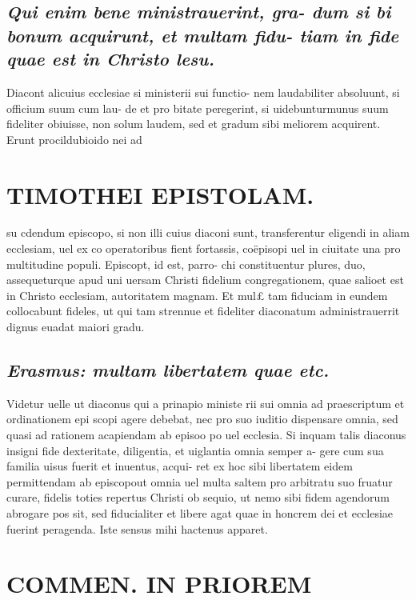 \documentclass{article}
\begin{document}
\begin{pages}
\subsection*{\textit{Qui enim bene ministrauerint, gra- dum si bi bonum acquirunt, et multam fidu- tiam in fide quae est in Christo lesu. }}\pstart Diacont alicuius ecclesiae si ministerii sui functio- nem laudabiliter absoluunt, si officium suum cum lau- de et pro bitate peregerint, si uidebunturmunus suum fideliter obiuisse, non solum laudem, sed et gradum sibi meliorem acquirent. Erunt procildubioido nei ad  \pend
\section*{TIMOTHEI EPISTOLAM. }
\marginpar{[ p.87 ]}\pstart su cdendum episcopo, si non illi cuius diaconi sunt, transferentur eligendi in aliam ecclesiam, uel ex co operatoribus fient fortassis, coëpisopi uel in ciuitate una pro multitudine populi. Episcopt, id est, parro- chi constituentur plures, duo, assequeturque apud uni uersam Christi fidelium congregationem, quae salioet est in Christo ecclesiam, autoritatem magnam. Et mul£ tam fiduciam in eundem collocabunt fideles, ut qui tam strennue et fideliter diaconatum administrauerrit dignus euadat maiori gradu.  \pend
{}
{}
\subsection*{\textit{Erasmus: multam libertatem quae etc. }}\pstart Videtur uelle ut diaconus qui a prinapio ministe rii sui omnia ad praescriptum et ordinationem epi scopi agere debebat, nec pro suo iuditio dispensare omnia, sed quasi ad rationem acapiendam ab episoo po uel ecclesia. Si inquam talis diaconus insigni fide dexteritate, diligentia, et uiglantia omnia semper a- gere cum sua familia uisus fuerit et inuentus, acqui- ret ex hoc sibi libertatem eidem permittendam ab episcopout omnia uel multa saltem pro arbitratu suo fruatur curare, fidelis toties repertus Christi ob sequio, ut nemo sibi fidem agendorum abrogare pos sit, sed fiducialiter et libere agat quae in honcrem dei et ecclesiae fuerint peragenda. Iste sensus mihi hactenus apparet.  \pend
\section*{COMMEN. IN PRIOREM }
\marginpar{[ p.88 ]}
{}

\end{pages}
\end{document}

